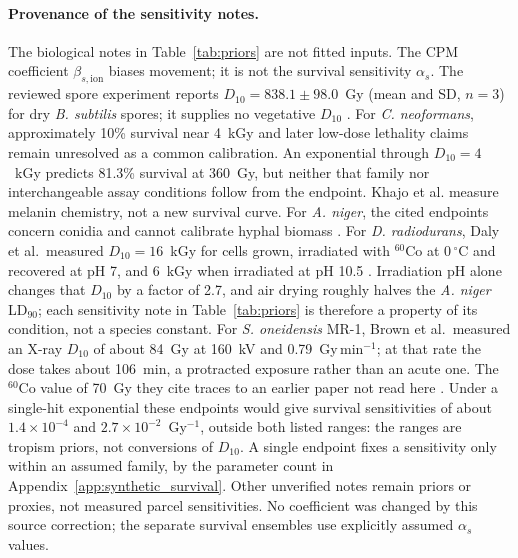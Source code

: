 \documentclass[11pt]{article}
\begin{document}
\paragraph{Provenance of the sensitivity notes.}
The biological notes in Table~\ref{tab:priors} are not fitted inputs. The CPM coefficient
$\beta_{s,\mathrm{ion}}$ biases movement; it is not the survival sensitivity $\alpha_s$.
The reviewed spore experiment reports $D_{10}=838.1\pm98.0$~Gy (mean and SD, $n=3$)
for dry \textit{B. subtilis} spores; it supplies no vegetative $D_{10}$ \cite{moeller2007}.
For \textit{C. neoformans}, approximately 10\% survival near 4~kGy
\cite{dadachova2004} and later low-dose lethality claims
\cite{dadachova2008pcmr,khajo2011} remain unresolved as a common calibration.
An exponential through $D_{10}=4$~kGy predicts 81.3\% survival at 360~Gy, but neither
that family nor interchangeable assay conditions follow from the endpoint. Khajo et al.
measure melanin chemistry, not a new survival curve. For \textit{A. niger}, the cited
endpoints concern conidia and cannot calibrate hyphal biomass \cite{cortesao2020}.
For \textit{D. radiodurans}, Daly et al.\ measured $D_{10}=16$~kGy for cells grown, irradiated
with $^{60}$Co at 0\,$^\circ$C and recovered at pH 7, and 6~kGy when irradiated at pH 10.5
\cite{daly2007}. Irradiation pH alone changes that $D_{10}$ by a factor of 2.7, and air drying
roughly halves the \textit{A. niger} LD$_{90}$; each sensitivity note in Table~\ref{tab:priors}
is therefore a property of its condition, not a species constant. For \textit{S. oneidensis}
MR-1, Brown et al.\ measured an X-ray $D_{10}$ of about 84~Gy at 160~kV and 0.79~Gy\,min$^{-1}$;
at that rate the dose takes about 106~min, a protracted exposure rather than an acute one. The
$^{60}$Co value of 70~Gy they cite traces to an earlier paper not read here \cite{brown2015}. Under a single-hit exponential these endpoints
would give survival sensitivities of about $1.4\times10^{-4}$ and $2.7\times10^{-2}$~Gy$^{-1}$,
outside both listed ranges: the ranges are tropism priors, not conversions of $D_{10}$. A single
endpoint fixes a sensitivity only within an assumed family, by the parameter count in
Appendix~\ref{app:synthetic_survival}.
Other unverified notes remain priors or proxies, not measured parcel sensitivities.
No coefficient was changed by this source correction; the separate survival ensembles
use explicitly assumed $\alpha_s$ values.
\end{document}
